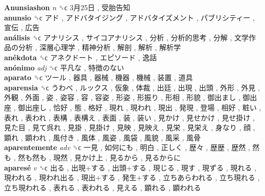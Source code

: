 \textbf{Anunsiashon} \emph{n}  ␝ϲ   3月25日 ,  受胎告知   \\
\textbf{anunsio} ␝ϲ   アド ,  アドバタイジング ,  アドバタイズメント ,  パブリシティー ,  宣伝 ,  広告   \\
\textbf{análisis} ␝ϲ   アナリシス ,  サイコアナリシス ,  分析 ,  分析的思考 ,  分解 ,  文学作品の分析 ,  深層心理学 ,  精神分析 ,  解剖 ,  解析 ,  解析学   \\
\textbf{anékdota} ␝ϲ   アネクドート ,  エピソード ,  逸話   \\
\textbf{anónimo} \emph{adj}  ␝ϲ   平凡な ,  特徴のない   \\
\textbf{aparato} ␝ϲ   ツール ,  器具 ,  器械 ,  機器 ,  機械 ,  装置 ,  道具   \\
\textbf{aparensia} ␝ϲ   うわべ ,  ルックス ,  仮象 ,  体裁 ,  出廷 ,  出現 ,  出頭 ,  外形 ,  外見 ,  外観 ,  外面 ,  姿 ,  姿容 ,  容 ,  容姿 ,  形姿 ,  形振り ,  形相 ,  形貌 ,  御出まし ,  御出座 ,  御出座し ,  恰好 ,  態 ,  格好 ,  現れ ,  現われ ,  現出 ,  発現 ,  登場 ,  相好 ,  粧い ,  表れ ,  表われ ,  表構 ,  表構え ,  表面 ,  装 ,  装い ,  見かけ ,  見せかけ ,  見せ掛け ,  見た目 ,  見て呉れ ,  見掛 ,  見掛け ,  見映 ,  見映え ,  見栄 ,  見栄え ,  身なり ,  顔 ,  顕れ ,  顕われ ,  風付き ,  風体 ,  風姿 ,  風袋 ,  風貌 ,  風采 ,  風骨   \\
\textbf{aparentemente} \emph{adv}  ␝ϲ   一見 ,  如何にも ,  明白 ,  正しく ,  歴々 ,  歴歴 ,  歴然 ,  然も ,  然も然も ,  現然 ,  見かけ上 ,  見るから ,  見るからに   \\
\textbf{aparesé} \emph{v}  ␝ϲ   出る ,  出現+する ,  出頭+する ,  現じる ,  現す ,  現ずる ,  現れる ,  現われる ,  現われ出る ,  現出+する ,  発生+する ,  立ちあらわれる ,  立ち現れる ,  立ち現われる ,  表れる ,  表われる ,  見える ,  顕れる ,  顕われる   \\
